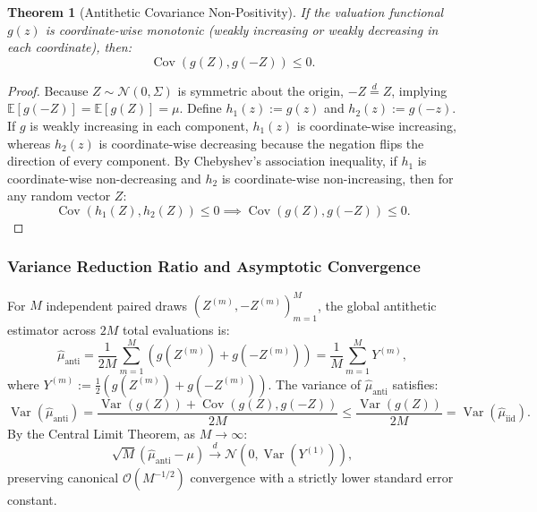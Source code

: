 \documentclass{article}
\theoremstyle{plain}
\newtheorem{theorem}{Theorem}[section]
\theoremstyle{definition}
\theoremstyle{remark}
\begin{document}
\begin{theorem}[Antithetic Covariance Non-Positivity]
If the valuation functional $g(z)$ is coordinate-wise monotonic (weakly increasing or weakly decreasing in each coordinate), then:
\begin{equation}
\operatorname{Cov}(g(Z), g(-Z)) \le 0.
\end{equation}
\end{theorem}

\begin{proof}
Because $Z \sim \mathcal{N}(0, \Sigma)$ is symmetric about the origin, $-Z \overset{d}{=} Z$, implying $\mathbb{E}[g(-Z)] = \mathbb{E}[g(Z)] = \mu$. Define $h_1(z) := g(z)$ and $h_2(z) := g(-z)$. If $g$ is weakly increasing in each component, $h_1(z)$ is coordinate-wise increasing, whereas $h_2(z)$ is coordinate-wise decreasing because the negation flips the direction of every component. By Chebyshev's association inequality, if $h_1$ is coordinate-wise non-decreasing and $h_2$ is coordinate-wise non-increasing, then for any random vector $Z$:
\begin{equation}
\operatorname{Cov}(h_1(Z), h_2(Z)) \le 0 \implies \operatorname{Cov}(g(Z), g(-Z)) \le 0.
\end{equation}
\end{proof}

\subsubsection{Variance Reduction Ratio and Asymptotic Convergence}
For $M$ independent paired draws $(Z^{(m)}, -Z^{(m)})_{m=1}^M$, the global antithetic estimator across $2M$ total evaluations is:
\begin{equation}
\hat{\mu}_{\text{anti}} = \frac{1}{2M}\sum_{m=1}^M \left(g(Z^{(m)}) + g(-Z^{(m)})\right) = \frac{1}{M}\sum_{m=1}^M Y^{(m)},
\end{equation}
where $Y^{(m)} := \frac{1}{2}\left(g(Z^{(m)}) + g(-Z^{(m)})\right)$. The variance of $\hat{\mu}_{\text{anti}}$ satisfies:
\begin{equation}
\operatorname{Var}(\hat{\mu}_{\text{anti}}) = \frac{\operatorname{Var}(g(Z)) + \operatorname{Cov}(g(Z), g(-Z))}{2M} \le \frac{\operatorname{Var}(g(Z))}{2M} = \operatorname{Var}(\hat{\mu}_{\text{iid}}).
\end{equation}
By the Central Limit Theorem, as $M \to \infty$:
\begin{equation}
\sqrt{M}\left(\hat{\mu}_{\text{anti}} - \mu\right) \xrightarrow{d} \mathcal{N}\left(0, \operatorname{Var}(Y^{(1)})\right),
\end{equation}
preserving canonical $\mathcal{O}(M^{-1/2})$ convergence with a strictly lower standard error constant.
\end{document}
